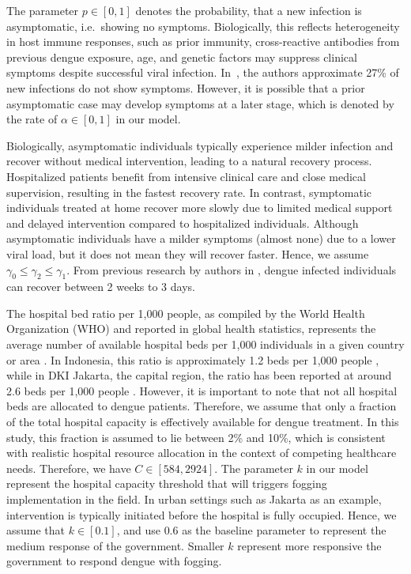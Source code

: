 \documentclass[preprint]{elsarticle}
\begin{document}
The parameter $p \in [0,1]$ denotes the probability, that a new infection is asymptomatic, i.e.~showing no symptoms. Biologically, this reflects heterogeneity in host immune responses, such as prior immunity, cross-reactive antibodies from previous dengue exposure, age, and genetic factors may suppress clinical symptoms despite successful viral infection. In~\cite{ALDILA2024115729}, the authors approximate 27\% of new infections do not show symptoms. However, it is possible that a prior asymptomatic case may develop symptoms at a later stage, which is denoted by the rate of $\alpha \in [0,1]$ in our model.

Biologically, asymptomatic individuals typically experience milder infection and recover without medical intervention, leading to a natural recovery process. Hospitalized patients benefit from intensive clinical care and close medical supervision, resulting in the fastest recovery rate. In contrast, symptomatic individuals treated at home recover more slowly due to limited medical support and delayed intervention compared to hospitalized individuals. Although asymptomatic individuals have a milder symptoms (almost none) due to a lower viral load, but it does not mean they will recover faster. Hence, we assume  $\gamma_0\leq\gamma_2 \leq \gamma_1$. From previous research by authors in \cite{ALDILA2024115729,WOODALL201467,XUE2021125742,Rashkov01012021}, dengue infected individuals can recover between 2 weeks to 3 days.


The hospital bed ratio per 1,000 people, as compiled by the World Health Organization (WHO) and reported in global health statistics, represents the average number of available hospital beds per 1,000 individuals in a given country or area \cite{hospitalBedsWHO}. In Indonesia, this ratio is approximately 1.2 beds per 1,000 people \cite{hospitalBedsIndonesia}, while in DKI Jakarta, the capital region, the ratio has been reported at around 2.6 beds per 1,000 people \cite{hospitalBedsJakarta}. However, it is important to note that not all hospital beds are allocated to dengue patients. Therefore, we assume that only a fraction of the total hospital capacity is effectively available for dengue treatment. In this study, this fraction is assumed to lie between 2\% and 10\%, which is consistent with realistic hospital resource allocation in the context of competing healthcare needs. Therefore, we have $C \in [584, 2924]$. The parameter $k$ in our model represent the hospital capacity threshold that will triggers fogging implementation in the field. In urban settings such as Jakarta as an example, intervention is typically initiated before the hospital is fully occupied. Hence, we assume that $k \in [0.1]$, and use $0.6$ as the baseline parameter to represent the medium response of the government. Smaller $k$ represent more responsive the government to respond dengue with fogging.
\end{document}

